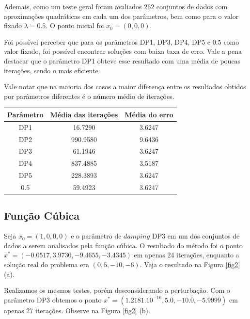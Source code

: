 \documentclass[12pt,a4paper]{article}
\begin{document}
	Ademais, como um teste geral foram avaliados 262 conjuntos de dados com aproximações quadráticas em cada um dos parâmetros, bem como para o valor fixado $\lambda = 0.5.$ O ponto inicial foi $x_0 = (0, 0, 0).$
	
	Foi possível perceber que para os parâmetros DP1, DP3, DP4, DP5 e $0.5$ como valor fixado, foi possível encontrar soluções com baixa taxa de erro. Vale a pena destacar que o parâmetro DP1 obteve esse resultado com uma média de poucas iterações, sendo o mais eficiente.
	
	Vale notar que na maioria dos casos a maior diferença entre os resultados obtidos por parâmetros diferentes é o número médio de iterações.
	
	\begin{table}[H]
		\centering
		\begin{tabular}{|c|c|c|}
			\hline
			Parâmetro & Média das iterações & Média do erro\\
			\hline
			
			DP1 & 16.7290 & 3.6247\\
			\hline
			DP2 & 990.9580 & 9.6436\\ \hline
			DP3 & 61.1946 & 3.6247\\ \hline
			DP4 & 837.4885 & 3.5187\\ \hline
			DP5 & 228.3893 & 3.6247\\ \hline
			0.5 & 59.4923 & 3.6247\\		\hline	
			
		\end{tabular}
	\end{table}
	\subsection{Função Cúbica} \label{cub}
		Seja $x_0 = (1, 0, 0,0)$ e o parâmetro de $damping$ DP3 em um dos conjuntos de dados a serem analisados pela função cúbica. O resultado do método foi o ponto $x^* = (-0.0517, 3.9730, -9.4655, -3.4345)$ em apenas 24 iterações, enquanto a solução real do problema era $(0,5,-10,-6).$ Veja o resultado na Figura \ref{fig2} (a).
	
	Realizamos os mesmos testes, porém desconsiderando a perturbação. Com o parâmetro DP3 obtemos o ponto $x^* = (1.2181.10^{-16}, 5.0, -10.0, -5.9999)$ em apenas 27 iterações. Observe na Figura \ref{fig2} (b).
	
\end{document}
